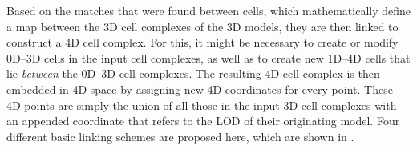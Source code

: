 Based on the matches that were found between cells, which mathematically define a map between the 3D cell complexes of the 3D models, they are then linked to construct a 4D cell complex.
For this, it might be necessary to create or modify 0D--3D cells in the input cell complexes, as well as to create new 1D--4D cells that lie \emph{between} the 0D--3D cell complexes.
The resulting 4D cell complex is then embedded in 4D space by assigning new 4D coordinates for every point.
These 4D points are simply the union of all those in the input 3D cell complexes with an appended coordinate that refers to the LOD of their originating model.
Four different basic linking schemes are proposed here, which are shown in .
\begin{figure}[tb]
  \begin{center}
  \quad


\end{center}
\end{figure}
